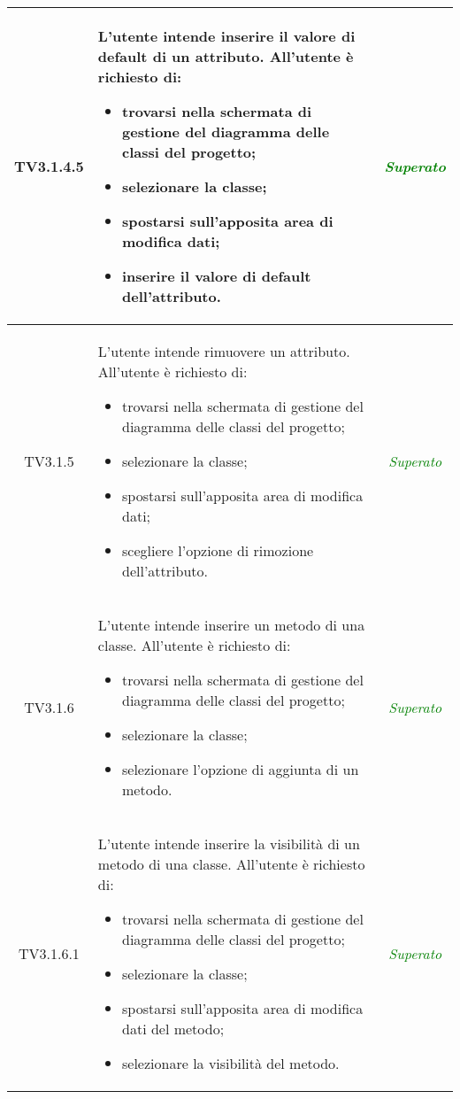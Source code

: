 \begin{longtable}{|c|>{}m{8cm}|c|}
\hypertarget{TV3.1.4.5}{TV3.1.4.5} & L'utente intende inserire il valore di default  di un attributo.
All'utente è richiesto di:
\begin{itemize}
	\item trovarsi nella schermata di gestione del diagramma delle classi del progetto;
	\item selezionare la classe;
	\item spostarsi sull'apposita area di modifica dati;
	\item inserire il valore di default  dell'attributo.
\end{itemize} & \textcolor{Green}{\textit{Superato}}\\ \hline

\hypertarget{TV3.1.5}{TV3.1.5} & L'utente intende rimuovere un attributo.
All'utente è richiesto di:
\begin{itemize}
	\item trovarsi nella schermata di gestione del diagramma delle classi del progetto;
	\item selezionare la classe;
	\item spostarsi sull'apposita area di modifica dati;
	\item scegliere l'opzione di rimozione dell'attributo.
\end{itemize} & \textcolor{Green}{\textit{Superato}}\\ \hline

\hypertarget{TV3.1.6}{TV3.1.6} & L'utente intende inserire un metodo di una classe.
All'utente è richiesto di:
\begin{itemize}
	\item trovarsi nella schermata di gestione del diagramma delle classi del progetto;
	\item selezionare la classe;
	\item selezionare l'opzione di aggiunta di un metodo.
\end{itemize} & \textcolor{Green}{\textit{Superato}}\\ \hline

\hypertarget{TV3.1.6.1}{TV3.1.6.1} & L'utente intende inserire la visibilità di un metodo di una classe.
All'utente è richiesto di:
\begin{itemize}
	\item trovarsi nella schermata di gestione del diagramma delle classi del progetto;
	\item selezionare la classe;
	\item spostarsi sull'apposita area di modifica dati del metodo;
	\item selezionare la visibilità del metodo.
\end{itemize} & \textcolor{Green}{\textit{Superato}}\\ \hline


\end{longtable}
